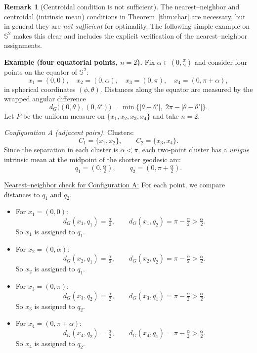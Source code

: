 \documentclass[12pt, reqno]{amsart}
\theoremstyle{plain}
\theoremstyle{definition}
\newtheorem{remark}[subsection]{Remark}
\newcommand{\D}[1]{\mathbb{#1}}%
\begin{document}
\begin{remark}[Centroidal condition is not sufficient]\label{rem:not-sufficient-easy}
The nearest--neighbor and centroidal (intrinsic mean) conditions in Theorem~\ref{thm:char} are necessary, but in general they are \emph{not sufficient} for optimality. The following simple example on $\D S^2$ makes this clear and includes the explicit verification of the nearest--neighbor assignments.

\medskip
\noindent\textbf{Example (four equatorial points, $n=2$).}
Fix $\alpha\in(0,\frac{\pi}{2})$ and consider four points on the equator of $\D S^2$:
\[
x_1=(0,0),\quad x_2=(0,\alpha),\quad x_3=(0,\pi),\quad x_4=(0,\pi+\alpha),
\]
in spherical coordinates $(\phi,\theta)$. Distances along the equator are measured by the wrapped angular difference
\[
d_G\big((0,\theta),(0,\theta')\big)=\min\big\{|\theta-\theta'|,\;2\pi-|\theta-\theta'|\big\}.
\]
Let $P$ be the uniform measure on $\{x_1,x_2,x_3,x_4\}$ and take $n=2$.

\medskip
\emph{Configuration A (adjacent pairs).}  
Clusters:
\[
C_1=\{x_1,x_2\},\qquad C_2=\{x_3,x_4\}.
\]
Since the separation in each cluster is $\alpha<\pi$, each two-point cluster has a \emph{unique} intrinsic mean at the midpoint of the shorter geodesic arc:
\[
q_1=(0,\tfrac{\alpha}{2}),\qquad q_2=(0,\pi+\tfrac{\alpha}{2}).
\]

\underline{Nearest--neighbor check for Configuration A:}  
For each point, we compare distances to $q_1$ and $q_2$.

\smallskip
\begin{itemize}
\item For $x_1=(0,0)$:
\[
d_G(x_1,q_1)=\tfrac{\alpha}{2},\qquad d_G(x_1,q_2)=\pi-\tfrac{\alpha}{2}>\tfrac{\alpha}{2}.
\]
So $x_1$ is assigned to $q_1$.

\item For $x_2=(0,\alpha)$:
\[
d_G(x_2,q_1)=\tfrac{\alpha}{2},\qquad d_G(x_2,q_2)=\pi-\tfrac{\alpha}{2}>\tfrac{\alpha}{2}.
\]
So $x_2$ is assigned to $q_1$.

\item For $x_3=(0,\pi)$:
\[
d_G(x_3,q_2)=\tfrac{\alpha}{2},\qquad d_G(x_3,q_1)=\pi-\tfrac{\alpha}{2}>\tfrac{\alpha}{2}.
\]
So $x_3$ is assigned to $q_2$.

\item For $x_4=(0,\pi+\alpha)$:
\[
d_G(x_4,q_2)=\tfrac{\alpha}{2},\qquad d_G(x_4,q_1)=\pi-\tfrac{\alpha}{2}>\tfrac{\alpha}{2}.
\]
So $x_4$ is assigned to $q_2$.
\end{itemize}


\end{remark}
\end{document}
